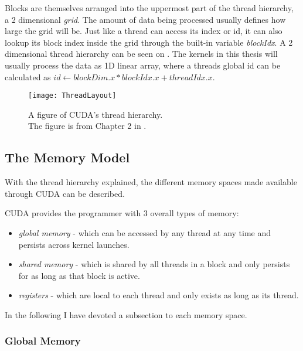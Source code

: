 
Blocks are themselves arranged into the uppermost part of the thread hierarchy,
a 2 dimensional \textit{grid}. The amount of data being processed usually
defines how large the grid will be. Just like a thread can access its index or
id, it can also lookup its block index inside the grid through the built-in
variable \textit{blockIdx}. A 2 dimensional thread hierarchy can be seen on
. The kernels in this thesis will usually process the
data as 1D linear array, where a threads global id can be calculated as $id
\leftarrow blockDim.x * blockIdx.x + threadIdx.x$.

\begin{figure}
  \centering
  \texttt{[image: ThreadLayout]}
  \caption[CUDA's thread hierarchy.]{A figure of CUDA's thread
    hierarchy.\\ The figure is from Chapter 2 in .}
  \label{fig:threadLayout}
\end{figure}




\subsection{The Memory Model}\label{sec:memoryModel}

With the thread hierarchy explained, the different memory spaces made available
through CUDA can be described.

CUDA provides the programmer with 3 overall types of memory:

\begin{itemize}
\item \textit{global memory} - which can be accessed by any thread at any time
  and persists across kernel launches.
\item \textit{shared memory} - which is shared by all threads in a block and
  only persists for as long as that block is active.
\item \textit{registers} - which are local to each thread and only exists as
  long as its thread.
\end{itemize}

In the following I have devoted a subsection to each memory space.

\subsubsection{Global Memory}


